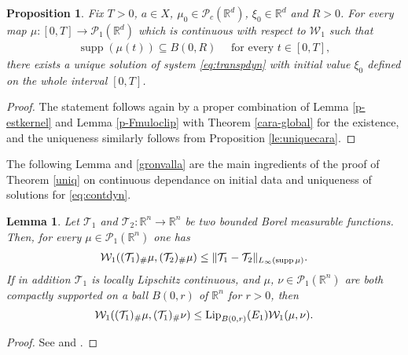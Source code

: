 \documentclass[A4paper,11pt]{article}
\newtheorem{lemma}[theorem]{Lemma}
\newtheorem{proposition}[theorem]{Proposition}
\theoremstyle{definition}
\newcommand{\Lip}{\textup{Lip}}
\newcommand{\R}{\mathbb{R}}
\newcommand{\W}{\mathcal{W}}
\newcommand{\PP}{\mathcal{P}_1}
\DeclareMathOperator{\supp}{supp}
\begin{document}
\begin{proposition}\label{exmono}
Fix $T > 0$, $a \in X$, $\mu_0 \in \mathcal{P}_c(\R^d)$, $\xi_0 \in \R^d$ and $R > 0$. %
For every map $\mu:[0,T] \rightarrow \PP(\R^d)$ which is continuous with respect to $\W_1$ such that
\begin{align*}
\supp(\mu(t)) \subseteq B(0,R) \quad \text{ for every } t \in [0,T],
\end{align*}
there exists a unique solution of system \eqref{eq:transpdyn} with initial value $\xi_0$ defined on the whole interval $[0,T]$.
\end{proposition}
\begin{proof}
The statement follows again by a proper combination of Lemma \ref{p-estkernel}  and  Lemma \ref{p-Fmuloclip} with Theorem \ref{cara-global}
for the existence, and the uniqueness similarly follows from Proposition \ref{le:uniquecara}.

\end{proof}


The following Lemma and \eqref{gronvalla} are the main ingredients of the proof of Theorem \ref{uniq} on continuous dependance on initial data and uniqueness
of solutions for \eqref{eq:contdyn}.

\begin{lemma}\label{primstim}
Let $\mathcal{T}_1$ and $\mathcal{T}_2 \colon \R^n \to \R^n$ be two bounded Borel measurable functions. Then, for every $\mu \in \PP(\R^n)$ one has
\begin{align*}
\W_1((\mathcal{T}_1)_{\#}\mu, (\mathcal{T}_2)_{\#} \mu) \le \|\mathcal{T}_1-\mathcal{T}_2\|_{L_\infty({\rm supp}\,\mu)}.
\end{align*}
If in addition $\mathcal{T}_1$ is locally Lipschitz continuous, and $\mu$, $\nu \in \PP(\R^n)$ are both compactly supported on a ball $B(0,r)$ of $\R^n$ for $r>0$, then
\begin{align*}
\W_1((\mathcal{T}_1)_{\#} \mu, (\mathcal{T}_1)_{\#} \nu) \le \Lip_{B(0,r)}(E_1) \W_1(\mu, \nu).
\end{align*}
\end{lemma}

\begin{proof}
See \cite[Lemma 3.11]{CanCarRos10} and \cite[Lemma 3.13]{CanCarRos10}.
\end{proof}
\end{document}
